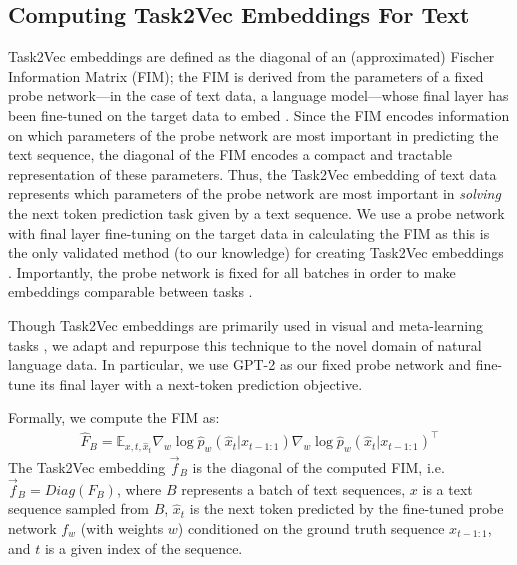 \subsection{Computing Task2Vec Embeddings For Text}
\label{body:computing_task2vec}
Task2Vec embeddings are defined as the diagonal of an (approximated) Fischer Information Matrix (FIM); the FIM is derived from the parameters of a fixed probe network---in the case of text data, a language model---whose final layer has been fine-tuned on the target data to embed \citep{task2vec}. 
Since the FIM encodes information on which parameters of the probe network are most important in predicting the text sequence, the diagonal of the FIM encodes a compact and tractable representation of these parameters. 
Thus, the Task2Vec embedding of text data represents which parameters of the probe network are most important in \textit{solving} the next token prediction task given by a text sequence. 
We use a probe network with final layer fine-tuning on the target data in calculating the FIM as this is the only validated method (to our knowledge) for creating Task2Vec embeddings \citep{task2vec}. 
Importantly, the probe network is fixed for all batches in order to make embeddings comparable between tasks \citep{task2vec}.

Though Task2Vec embeddings are primarily used in visual and meta-learning tasks \citep{task2vec, curse_low_div, 9577374}, we adapt and repurpose this technique to the novel domain of natural language data. 
In particular, we use GPT-2 \citep{gpt2} as our fixed probe network and fine-tune its final layer with a next-token prediction objective. 

Formally, we compute the FIM as:
\begin{equation*}
\begin{aligned}
    \hat F_B = 
                \mathbb E_{x, t, \hat x_t}
                    \nabla_w \log \hat p_w( \hat x_t | x_{t-1:1}) \nabla_w \log \hat p_w ( \hat x_t | x_{t-1:1})^\top
\end{aligned}
\end{equation*}
The Task2Vec embedding $\vec{f}_B$ is the diagonal of the computed FIM, i.e. $\vec{f}_B = Diag(F_B)$, where $B$ represents a batch of text sequences, $x$ is a text sequence sampled from $B$, $\hat{x}_t$ is the next token predicted by the fine-tuned probe network $f_w$ (with weights $w$) conditioned on the ground truth sequence $x_{t-1:1}$, and $t$ is a given index of the sequence.

